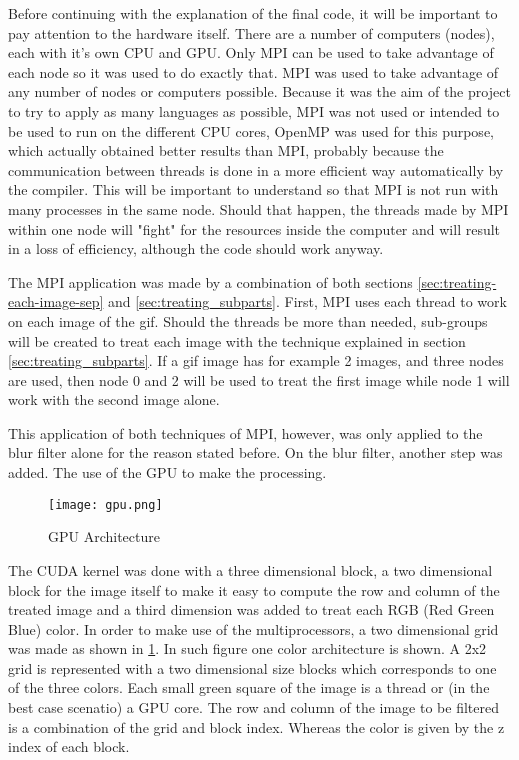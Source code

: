 \documentclass[conference,compsoc]{IEEEtran}
\begin{document}
Before continuing with the explanation of the final code, it will be important to pay attention to the hardware itself. There are a number of computers (nodes), each with it's own CPU and GPU. Only MPI can be used to take advantage of each node so it was used to do exactly that. MPI was used to take advantage of any number of nodes or computers possible. Because it was the aim of the project to try to apply as many languages as possible, MPI was not used or intended to be used to run on the different CPU cores, OpenMP was used for this purpose, which actually obtained better results than MPI, probably because the communication between threads is done in a more efficient way automatically by the compiler. This will be important to understand so that MPI is not run with many processes in the same node. Should that happen, the threads made by MPI within one node will "fight" for the resources inside the computer and will result in a loss of efficiency, although the code should work anyway.

The MPI application was made by a combination of both sections \ref{sec:treating-each-image-sep} and \ref{sec:treating_subparts}. First, MPI uses each thread to work on each image of the gif. Should the threads be more than needed, sub-groups will be created to treat each image with the technique explained in section  \ref{sec:treating_subparts}. If a gif image has for example 2 images, and three nodes are used, then node 0 and 2 will be used to treat the first image while node 1 will work with the second image alone.

This application of both techniques of MPI, however, was only applied to the blur filter alone for the reason stated before. On the blur filter, another step was added. The use of the GPU to make the processing.

\begin{figure}[H]
	\texttt{[image: gpu.png]}	\centering
	\caption{GPU Architecture \label{fig:GPU-Architecture}}
\end{figure}

The CUDA kernel was done with a three dimensional block, a two dimensional block for the image itself to make it easy to compute the row and column of the treated image and a third dimension was added to treat each RGB (Red Green Blue) color. In order to make use of the multiprocessors, a two dimensional grid was made as shown in \ref{fig:GPU-Architecture}. In such figure one color architecture is shown. A 2x2 grid is represented with a two dimensional size blocks which corresponds to one of the three colors. Each small green square of the image is a thread or (in the best case scenatio) a GPU core. The row and column of the image to be filtered is a combination of the grid and block index. Whereas the color is given by the z index of each block.
\end{document}
